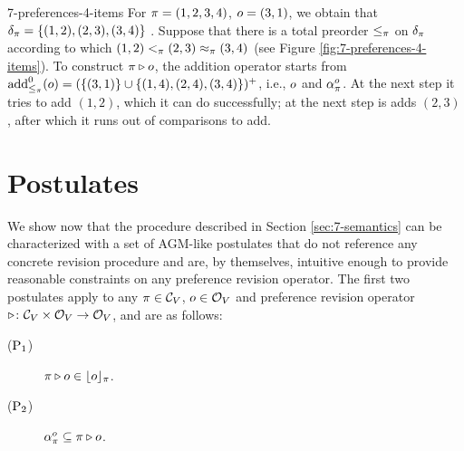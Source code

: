 \begin{xmpl}{}{7-preferences-4-items}
	For 
	$\pi=(1,2,3,4)$, $o=(3,1)$,
	we obtain that $\delta_\pi=\{(1,2),(2,3),(3,4)\}$ .
	Suppose that there is a total preorder $\le_\pi$ on $\delta_\pi$ according to which
	$(1,2)<_\pi (2,3)\approx_\pi (3,4)$ (see Figure \ref{fig:7-preferences-4-items}).
	To construct $\pi\triangleright o$, the addition operator starts from
	${\operatorname{add}}^0_{\le_\pi}(o)=(\{(3,1)\}\cup\{(1,4),(2,4),(3,4)\})^+$,
	i.e., $o$ and $\alpha_{\pi}^{o}$. At the next step it tries to add $(1,2)$,
	which it can do successfully; at the next step is adds $(2,3)$, after
	which it runs out of comparisons to add.	
\end{xmpl}












\section{Postulates}\label{sec:7-postulates}
We show now that the procedure described in Section \ref{sec:7-semantics}
can be characterized with a set of AGM-like postulates that 
do not reference any concrete revision procedure and are, by themselves,
intuitive enough to provide reasonable constraints on any preference revision operator.
The first two postulates apply to any $\pi\in\mathcal{C}_V$, $o\in\mathcal{O}_V$ 
and preference revision operator $\triangleright\colon\mathcal{C}_V\times\mathcal{O}_V\rightarrow\mathcal{O}_V$, 
and are as follows:

\begin{description}
	\item[($\mathrm{P}_{1}$)] $\pi\triangleright o\in\lfloor{o}\rfloor_\pi$.
	\item[($\mathrm{P}_{2}$)] $\alpha_{\pi}^{o}\subseteq \pi\triangleright o$.
\end{description}

